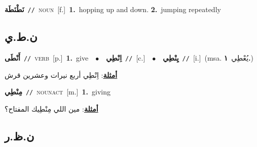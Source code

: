 \documentclass[10pt,a4paper,twoside]{article} %
\begin{document}
\begin{multicols}{2}
{\setlength\topsep{0pt}\textbf{\foreignlanguage{arabic}{نَطْنَطَة}}\ {\color{gray}\texttt{//}\color{black}}\ \textsc{noun}\ [f.]\ \textbf{1.}~hopping up and down.  \textbf{2.}~jumping repeatedly\ } \vspace{2mm}

\vspace{-3mm}
\subsection*{\color{blue}\foreignlanguage{arabic}{ن.ط.ي}\color{blue}{}} 

{\setlength\topsep{0pt}\textbf{\foreignlanguage{arabic}{أَنْطَى}}\ {\color{gray}\texttt{//}\color{black}}\ \textsc{verb}\ [p.]\ \textbf{1.}~give\ \ $\bullet$\ \ \setlength\topsep{0pt}\textbf{\foreignlanguage{arabic}{اِنْطِي}}\ {\color{gray}\texttt{//}\color{black}}\ [c.]\ \ $\bullet$\ \ \setlength\topsep{0pt}\textbf{\foreignlanguage{arabic}{يِنْطِي}}\ {\color{gray}\texttt{//}\color{black}}\ [i.]\ \color{gray}(msa. \foreignlanguage{arabic}{يُعْطِي}~\foreignlanguage{arabic}{\textbf{١.}})\color{black}\  \begin{flushright}\color{gray}\foreignlanguage{arabic}{\textbf{\underline{\foreignlanguage{arabic}{أمثلة}}}: اِنْطِي أربع نيرات وعشرين قرش}\end{flushright}\color{black}} \vspace{2mm}

{\setlength\topsep{0pt}\textbf{\foreignlanguage{arabic}{مِنْطِي}}\ {\color{gray}\texttt{//}\color{black}}\ \textsc{noun\textunderscore act}\ [m.]\ \textbf{1.}~giving\  \begin{flushright}\color{gray}\foreignlanguage{arabic}{\textbf{\underline{\foreignlanguage{arabic}{أمثلة}}}: مين اللي مِنْطِيك المفتاح؟}\end{flushright}\color{black}} \vspace{2mm}

\vspace{-3mm}
\subsection*{\color{blue}\foreignlanguage{arabic}{ن.ظ.ر}\color{blue}{}} 


\end{multicols}
\end{document}
